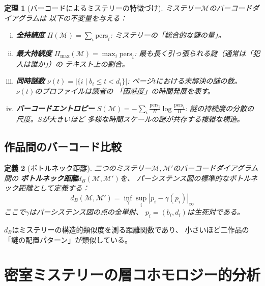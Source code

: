 \documentclass[12pt,twocolumn]{ltjsarticle}
\newtheorem{theorem}{定理}[section]
\newtheorem{definition}[theorem]{定義}
\newcommand{\Mys}{\mathcal{M}}
\newcommand{\pers}{\mathrm{pers}}
\begin{document}
\begin{theorem}[バーコードによるミステリーの特徴づけ]
\label{thm:barcode_characterization}
ミステリー$\Mys$のバーコードダイアグラムは
以下の不変量を与える：
\begin{enumerate}[(i)]
\item \textbf{全持続度}
$\Pi(\Mys) = \sum_i \pers_i$:
ミステリーの「総合的な謎の量」。

\item \textbf{最大持続度}
$\Pi_{\max}(\Mys) = \max_i \pers_i$:
最も長く引っ張られる謎（通常は「犯人は誰か」）の
テキスト上の割合。

\item \textbf{同時謎数}
$\nu(t) = |\{i \mid b_i \leq t < d_i\}|$:
ページ$t$における未解決の謎の数。
$\nu(t)$のプロファイルは読者の
「困惑度」の時間発展を表す。

\item \textbf{バーコードエントロピー}
$S(\Mys) = -\sum_i \frac{\pers_i}{\Pi} \log \frac{\pers_i}{\Pi}$:
謎の持続度の分散の尺度。$S$が大きいほど
多様な時間スケールの謎が共存する複雑な構造。
\end{enumerate}
\end{theorem}


\subsection{作品間のバーコード比較}

\begin{definition}[ボトルネック距離]
二つのミステリー$\Mys, \Mys'$のバーコードダイアグラム間の
\textbf{ボトルネック距離}$d_B(\Mys, \Mys')$を、
パーシステンス図の標準的なボトルネック距離として定義する：
\begin{equation}
d_B(\Mys, \Mys') = \inf_\gamma \sup_i |p_i - \gamma(p_i)|_\infty
\end{equation}
ここで$\gamma$はパーシステンス図の点の全単射、
$p_i = (b_i, d_i)$は生死対である。
\end{definition}

$d_B$はミステリーの構造的類似度を測る距離関数であり、
小さいほど二作品の「謎の配置パターン」が類似している。


\section{密室ミステリーの層コホモロジー的分析}
\label{sec:locked_room}
\end{document}
